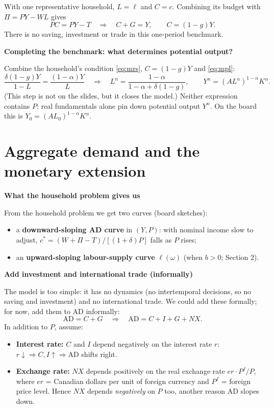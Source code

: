 \documentclass[11pt,letterpaper]{article}
\newcommand{\topic}[1]{\par\Needspace{4\baselineskip}\medskip\textbf{#1}\par\nobreak}
\newcommand{\w}{\omega}
\begin{document}
With one representative household, $L=\ell$ and $C=c$. Combining its budget with
$\Pi=PY-WL$ gives
\[
 PC=PY-T\quad\Longrightarrow\quad C+G=Y,\qquad C=(1-g)Y.
\]
There is no saving, investment or trade in this one-period benchmark.

\topic{Completing the benchmark: what determines potential output?}
Combine the household's condition \eqref{eq:mrs}, $C=(1-g)Y$ and \eqref{eq:mpl}:
\[
 \frac{\delta(1-g)Y}{1-L}=\frac{(1-\alpha)Y}{L}
 \quad\Longrightarrow\quad
 \boxed{L^n=\frac{1-\alpha}{1-\alpha+\delta(1-g)},\qquad
 Y^n=(AL^n)^{1-\alpha}K^\alpha.}
\]
(This step is not on the slides, but it closes the model.) Neither expression
contains $P$: real fundamentals alone pin down potential output $Y^n$. On the
board this is $Y_0=(AL_0)^{1-\alpha}K^\alpha$.

\newpage
\section{Aggregate demand and the monetary extension}
\topic{What the household problem gives us}
From the household problem we get two curves (board sketches):
\begin{itemize}
 \item a \textbf{downward-sloping AD curve} in $(Y,P)$: with nominal income slow
 to adjust, $c^*=(W+\Pi-T)/[(1+\delta)P]$ falls as $P$ rises;
 \item an \textbf{upward-sloping labour-supply curve} $\ell(\w)$ (when $b>0$; Section 2).
\end{itemize}

\topic{Add investment and international trade (informally)}
The model is too simple: it has no dynamics (no intertemporal decisions, so no
saving and investment) and no international trade. We could add these formally;
for now, add them to AD informally:
\begin{equation}
 \mathrm{AD}=C+G\quad\Longrightarrow\quad \mathrm{AD}=C+I+G+NX.
 \label{eq:ad}
\end{equation}
In addition to $P$, assume:
\begin{itemize}
 \item \textbf{Interest rate:} $C$ and $I$ depend negatively on the interest rate $r$:
 $r\downarrow\Rightarrow C,I\uparrow\Rightarrow\mathrm{AD}$ shifts right.
 \item \textbf{Exchange rate:} $NX$ depends positively on the real exchange rate
 $er\cdot P^f/P$, where $er$ = Canadian dollars per unit of foreign currency and
 $P^f$ = foreign price level. Hence $NX$ depends \emph{negatively} on $P$ too,
 another reason AD slopes down.
\end{itemize}
\end{document}
